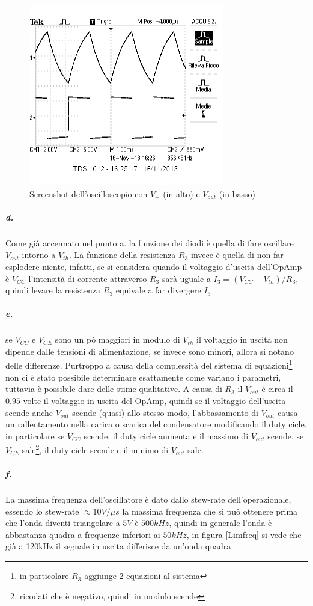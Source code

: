 \documentclass{article}
\begin{document}
	\begin{figure}
		\centering
	\includegraphics{immagini/V-_Vout.png}
	\caption{Screenshot dell'oscilloscopio con $V_-$ (in alto) e $V_{out}$ (in basso)}
	\label{V-Vout}
	\end{figure}
		
	\subparagraph{d.}
		Come già accennato nel punto a. la funzione dei diodi è quella di fare oscillare $V_{out}$ intorno a $V_{th}$.\newline 
		La funzione della resistenza $R_3$ invece è quella di non far esplodere niente, infatti, se si considera quando il voltaggio d'uscita dell'OpAmp è $V_{CC}$ l'intensità di corrente attraverso $R_3$ sarà uguale a  $I_3=(V_{CC}-V_{th})/R_3$, quindi levare la resistenza $R_3$ equivale a far divergere $I_3$ 
	\subparagraph{e.}
		se $V_{CC}$ e $V_{CE}$ sono un pò maggiori in modulo di $V_{th}$ il voltaggio in uscita non dipende dalle tensioni di alimentazione, se invece sono minori, allora si notano delle differenze.\newline
		Purtroppo a causa della complessità del sistema di equazioni\footnote{in particolare $R_3$ aggiunge 2 equazioni al sistema} non ci è stato possibile determinare esattamente come variano i parametri, tuttavia è possibile dare delle stime qualitative.\newline
		A causa di $R_3$ il $V_{out}$ è circa il $0.95$ volte il voltaggio in uscita del OpAmp, quindi se il voltaggio dell'uscita scende anche $V_{out}$ scende (quasi) allo stesso modo, l'abbassamento di $V_{out}$ causa un rallentamento nella carica o scarica del condensatore modificando il duty cicle.\newline
		in particolare se $V_{CC}$ scende, il duty cicle aumenta e il massimo di $V_{out}$ scende, se $V_{CE}$ sale\footnote{ricodati che è negativo, quindi in modulo scende}, il duty cicle scende e il minimo di $V_{out}$ sale.
	\subparagraph{f.}
		La massima frequenza dell'oscillatore è dato dallo stew-rate dell'operazionale, essendo lo stew-rate $\approx 10V/\mu s$ la massima frequenza che si può ottenere prima che l'onda diventi triangolare a $5V$ è $500kHz$, quindi in generale l'onda è abbastanza quadra a frequenze inferiori ai $50kHz$, in figura \ref{Limfreq} si vede che già a 120kHz il segnale in uscita differisce da un'onda quadra
		
\end{document}
